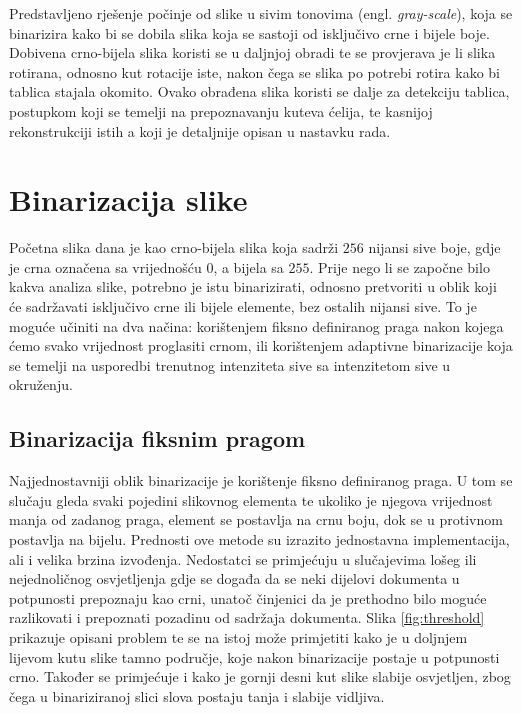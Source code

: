 \documentclass[times, utf8, zavrsni, numeric]{fer}
\begin{document}
Predstavljeno rješenje počinje od slike u sivim tonovima (engl. \textit{gray-scale}), koja se binarizira kako bi se dobila slika koja se sastoji od isključivo crne i bijele boje.
Dobivena crno-bijela slika koristi se u daljnjoj obradi te se provjerava je li slika rotirana, odnosno kut rotacije iste, nakon čega se slika po potrebi rotira kako bi tablica stajala okomito.
Ovako obrađena slika koristi se dalje za detekciju tablica, postupkom koji se temelji na prepoznavanju kuteva ćelija, te kasnijoj rekonstrukciji istih a koji je detaljnije opisan u nastavku rada.


\chapter{Binarizacija slike}
Početna slika dana je kao crno-bijela slika koja sadrži $256$ nijansi sive boje, gdje je crna označena sa vrijednošću $0$, a bijela sa $255$.
Prije nego li se započne bilo kakva analiza slike, potrebno je istu binarizirati, odnosno pretvoriti u oblik koji će sadržavati isključivo crne ili bijele elemente, bez ostalih nijansi sive.
To je moguće učiniti na dva načina: korištenjem fiksno definiranog praga nakon kojega ćemo svako vrijednost proglasiti crnom, ili korištenjem adaptivne binarizacije koja se temelji na usporedbi trenutnog intenziteta sive sa intenzitetom sive u okruženju.

\section{Binarizacija fiksnim pragom}
Najjednostavniji oblik binarizacije je korištenje fiksno definiranog praga.
U tom se slučaju gleda svaki pojedini slikovnog elementa te ukoliko je njegova vrijednost manja od zadanog praga, element se postavlja na crnu boju, dok se u protivnom postavlja na bijelu.
Prednosti ove metode su izrazito jednostavna implementacija, ali i velika brzina izvođenja. 
Nedostatci se primjećuju u slučajevima lošeg ili nejednoličnog osvjetljenja gdje se događa da se neki dijelovi dokumenta u potpunosti prepoznaju kao crni, unatoč činjenici da je prethodno bilo moguće razlikovati i prepoznati pozadinu od sadržaja dokumenta.
Slika \ref{fig:threshold} prikazuje opisani problem te se na istoj može primjetiti kako je u doljnjem lijevom kutu slike tamno područje, koje nakon binarizacije postaje u potpunosti crno. 
Također se primjećuje i kako je gornji desni kut slike slabije osvjetljen, zbog čega u binariziranoj slici slova postaju tanja i slabije vidljiva.\\
\end{document}
